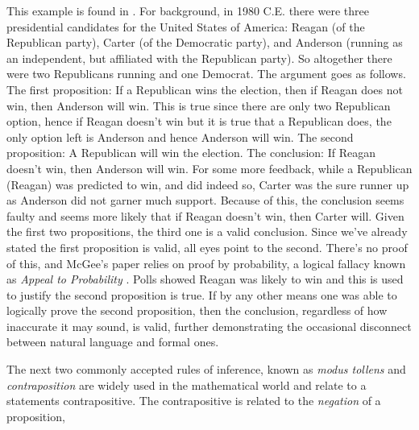         \begin{example}
            This example is found in \cite{McGee1985ModusPonens}. For
            background, in 1980 C.E. there were three presidential candidates
            for the United States of America: Reagan (of the Republican party),
            Carter (of the Democratic party), and Anderson (running as an
            independent, but affiliated with the Republican party). So
            altogether there were two Republicans running and one Democrat. The
            argument goes as follows. The first proposition: If a Republican
            wins the election, then if Reagan does not win, then Anderson will
            win. This is true since there are only two Republican option, hence
            if Reagan doesn't win but it is true that a Republican does, the
            only option left is Anderson and hence Anderson will win. The second
            proposition: A Republican will win the election. The conclusion: If
            Reagan doesn't win, then Anderson will win. For some more feedback,
            while a Republican (Reagan) was predicted to win, and did indeed so,
            Carter was the sure runner up as Anderson did not garner much
            support. Because of this, the conclusion seems faulty and seems more
            likely that if Reagan doesn't win, then Carter will. Given the first
            two propositions, the third one is a valid conclusion. Since we've
            already stated the first proposition is valid, all eyes point to the
            second. There's no proof of this, and McGee's paper relies on proof
            by probability, a logical fallacy known as
            \textit{Appeal to Probability}%
            . Polls showed Reagan was likely to win
            and this is used to justify the second proposition is true. If by
            any other means one was able to logically prove the second
            proposition, then the conclusion, regardless of how inaccurate it
            may sound, is valid, further demonstrating the occasional disconnect
            between natural language and formal ones.
        \end{example}
        The next two commonly accepted rules of inference, known as
        \textit{modus tollens} and
        \textit{contraposition} are widely used
        in the mathematical world and relate to a statements contrapositive.
        The contrapositive is related to the \textit{negation} of a proposition,
